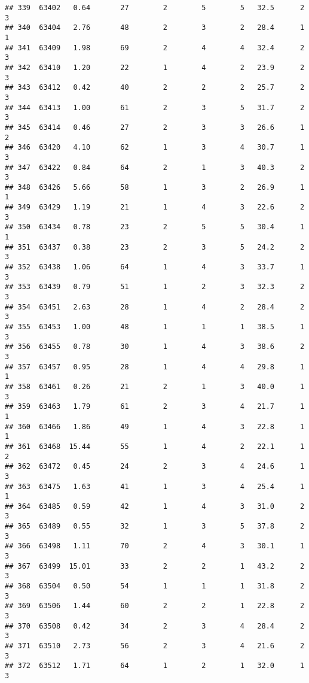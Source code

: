 \documentclass[
]{article}
\begin{document}
\begin{verbatim}
## 339  63402   0.64       27        2        5        5   32.5      2      3
## 340  63404   2.76       48        2        3        2   28.4      1      1
## 341  63409   1.98       69        2        4        4   32.4      2      3
## 342  63410   1.20       22        1        4        2   23.9      2      3
## 343  63412   0.42       40        2        2        2   25.7      2      3
## 344  63413   1.00       61        2        3        5   31.7      2      3
## 345  63414   0.46       27        2        3        3   26.6      1      2
## 346  63420   4.10       62        1        3        4   30.7      1      3
## 347  63422   0.84       64        2        1        3   40.3      2      3
## 348  63426   5.66       58        1        3        2   26.9      1      1
## 349  63429   1.19       21        1        4        3   22.6      2      3
## 350  63434   0.78       23        2        5        5   30.4      1      1
## 351  63437   0.38       23        2        3        5   24.2      2      3
## 352  63438   1.06       64        1        4        3   33.7      1      3
## 353  63439   0.79       51        1        2        3   32.3      2      3
## 354  63451   2.63       28        1        4        2   28.4      2      3
## 355  63453   1.00       48        1        1        1   38.5      1      3
## 356  63455   0.78       30        1        4        3   38.6      2      3
## 357  63457   0.95       28        1        4        4   29.8      1      1
## 358  63461   0.26       21        2        1        3   40.0      1      3
## 359  63463   1.79       61        2        3        4   21.7      1      1
## 360  63466   1.86       49        1        4        3   22.8      1      1
## 361  63468  15.44       55        1        4        2   22.1      1      2
## 362  63472   0.45       24        2        3        4   24.6      1      3
## 363  63475   1.63       41        1        3        4   25.4      1      1
## 364  63485   0.59       42        1        4        3   31.0      2      3
## 365  63489   0.55       32        1        3        5   37.8      2      3
## 366  63498   1.11       70        2        4        3   30.1      1      3
## 367  63499  15.01       33        2        2        1   43.2      2      3
## 368  63504   0.50       54        1        1        1   31.8      2      3
## 369  63506   1.44       60        2        2        1   22.8      2      3
## 370  63508   0.42       34        2        3        4   28.4      2      3
## 371  63510   2.73       56        2        3        4   21.6      2      3
## 372  63512   1.71       64        1        2        1   32.0      1      3

\end{verbatim}
\end{document}
